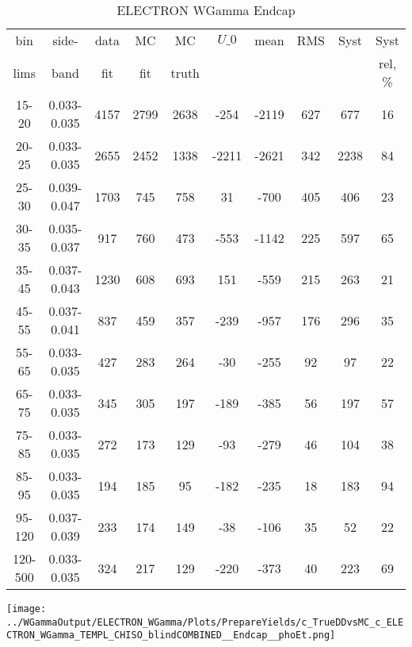 \documentclass{beamer}
\begin{document}
\begin{frame}
{
\begin{table}[h]
  	\tiny
  \begin{center}
  \caption{ELECTRON WGamma Endcap}
  \begin{tabular}{|c|c|c|c|c|c|c|c|c|c|}
    bin & side- & data & MC & MC    & $U\_{0}$ & mean & RMS & Syst & Syst \\ 
    lims & band & fit & fit & truth &       &      &     &      & rel, \% \\ \hline
    15-20 & 0.033-0.035 & 4157 & 2799 & 2638 & -254 & -2119 & 627 & 677 & 16  \\ \hline
    20-25 & 0.033-0.035 & 2655 & 2452 & 1338 & -2211 & -2621 & 342 & 2238 & 84  \\ \hline
    25-30 & 0.039-0.047 & 1703 & 745 & 758 & 31 & -700 & 405 & 406 & 23  \\ \hline
    30-35 & 0.035-0.037 & 917 & 760 & 473 & -553 & -1142 & 225 & 597 & 65  \\ \hline
    35-45 & 0.037-0.043 & 1230 & 608 & 693 & 151 & -559 & 215 & 263 & 21  \\ \hline
    45-55 & 0.037-0.041 & 837 & 459 & 357 & -239 & -957 & 176 & 296 & 35  \\ \hline
    55-65 & 0.033-0.035 & 427 & 283 & 264 & -30 & -255 & 92 & 97 & 22  \\ \hline
    65-75 & 0.033-0.035 & 345 & 305 & 197 & -189 & -385 & 56 & 197 & 57  \\ \hline
    75-85 & 0.033-0.035 & 272 & 173 & 129 & -93 & -279 & 46 & 104 & 38  \\ \hline
    85-95 & 0.033-0.035 & 194 & 185 & 95 & -182 & -235 & 18 & 183 & 94  \\ \hline
    95-120 & 0.037-0.039 & 233 & 174 & 149 & -38 & -106 & 35 & 52 & 22  \\ \hline
    120-500 & 0.033-0.035 & 324 & 217 & 129 & -220 & -373 & 40 & 223 & 69  \\ \hline
  \end{tabular}
  \label{tab:systSbVar_Meth1_ELECTRON_WGamma_Endcap}
  \end{center}
\end{table}

\texttt{[image: ../WGammaOutput/ELECTRON\_WGamma/Plots/PrepareYields/c\_TrueDDvsMC\_c\_ELECTRON\_WGamma\_TEMPL\_CHISO\_blindCOMBINED\_\_Endcap\_\_phoEt.png]} 

}
\end{frame}
\end{document}
